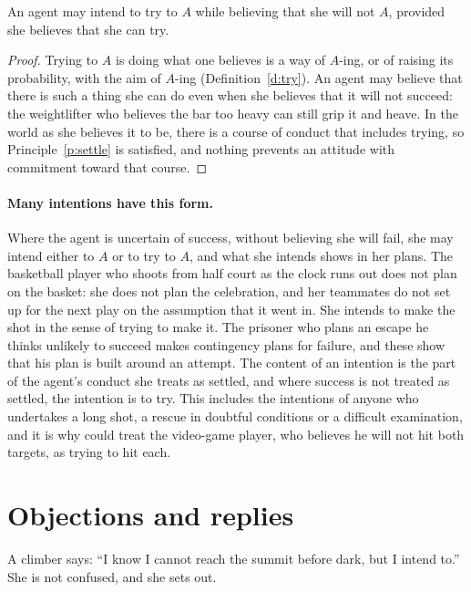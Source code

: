 \documentclass{situationist-preprint}
\begin{document}
\begin{theorem}\label{t:try}
An agent may intend to try to $A$ while believing that she will not $A$, provided she believes that she can try.
\end{theorem}

\begin{proof}
Trying to $A$ is doing what one believes is a way of $A$-ing, or of raising its probability, with the aim of $A$-ing (Definition~\ref{d:try}). An agent may believe that there is such a thing she can do even when she believes that it will not succeed: the weightlifter who believes the bar too heavy can still grip it and heave. In the world as she believes it to be, there is a course of conduct that includes trying, so Principle~\ref{p:settle} is satisfied, and nothing prevents an attitude with commitment toward that course.
\end{proof}

\paragraph{Many intentions have this form.} Where the agent is uncertain of success, without believing she will fail, she may intend either to $A$ or to try to $A$, and what she intends shows in her plans. The basketball player who shoots from half court as the clock runs out does not plan on the basket: she does not plan the celebration, and her teammates do not set up for the next play on the assumption that it went in. She intends to make the shot in the sense of trying to make it. The prisoner who plans an escape he thinks unlikely to succeed makes contingency plans for failure, and these show that his plan is built around an attempt. The content of an intention is the part of the agent's conduct she treats as settled, and where success is not treated as settled, the intention is to try. This includes the intentions of anyone who undertakes a long shot, a rescue in doubtful conditions or a difficult examination, and it is why \citet{Bratman1987} could treat the video-game player, who believes he will not hit both targets, as trying to hit each.

\section{Objections and replies}

\begin{objection}
A climber says: \enquote{I know I cannot reach the summit before dark, but I intend to.} She is not confused, and she sets out.
\end{objection}
\end{document}
